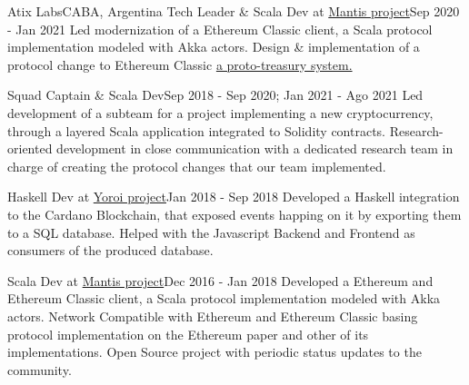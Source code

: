 \documentclass[letterpaper,11pt]{article}
\begin{document}
    \resumeSubheadingTitle
      {Atix Labs}{CABA, Argentina}
      {Tech Leader \& Scala Dev at \href{https://github.com/input-output-hk/mantis}{Mantis project}}{Sep 2020 - Jan 2021}
      {Led modernization of a Ethereum Classic client, a Scala protocol implementation modeled with Akka actors.}
      \resumeItemListStart
        \resumeItemWithDetails
          {Design \& implementation of a protocol change to Ethereum Classic}
          {\href{https://ecips.ethereumclassic.org/ECIPs/ecip-1098}{a proto-treasury system.}}
      \resumeItemListEnd

    \resumeSubheadingSubtitle
      {Squad Captain \& Scala Dev}{Sep 2018 - Sep 2020; Jan 2021 - Ago 2021}
      {Led development of a subteam for a project implementing a new cryptocurrency, through a layered Scala application integrated to Solidity contracts.}
      \resumeItemListStart
        \resumeItemWithDetails
          {Research-oriented development}
          {in close communication with a dedicated research team in charge of creating the protocol changes that our team implemented.}
      \resumeItemListEnd

    \resumeSubheadingSubtitle
      {Haskell Dev at \href{https://github.com/input-output-hk/project-icarus-importer}{Yoroi project}}{Jan 2018 - Sep 2018}
      {Developed a Haskell integration to the Cardano Blockchain, that exposed events happing on it by exporting them to a SQL database. Helped with the Javascript Backend and Frontend as consumers of the produced database.}
      \resumeItemListStart
      \resumeItemListEnd

    \resumeSubheadingSubtitle
      {Scala Dev at \href{https://github.com/input-output-hk/mantis}{Mantis project}}{Dec 2016 - Jan 2018}
      {Developed a Ethereum and Ethereum Classic client, a Scala protocol implementation modeled with Akka actors.}
      \resumeItemListStart
        \resumeItemWithDetails
          {Network Compatible with Ethereum and Ethereum Classic}
          {basing protocol implementation on the Ethereum paper and other of its implementations.}
        \resumeItemWithDetails
          {Open Source project}
          {with periodic status updates to the community.}
      \resumeItemListEnd
\end{document}

